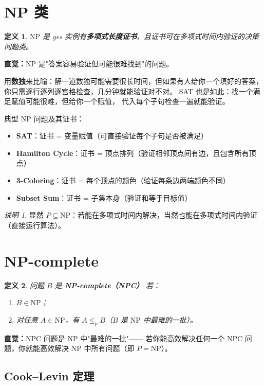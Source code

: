 \documentclass[UTF8,openany,12pt]{ctexbook}
\newtheorem{definition}{定义}[chapter]
\theoremstyle{remark}
\newtheorem{remark}{说明}[chapter]
\newcommand{\NP}{\mathrm{NP}}
\begin{document}
\section{NP 类}

\begin{definition}
$\NP$ 是 yes 实例有\textbf{多项式长度证书}，且证书可在多项式时间内验证的决策问题类。
\end{definition}

\textbf{直觉：}NP 是"答案容易验证但可能很难找到"的问题。

用\textbf{数独}来比喻：解一道数独可能需要很长时间，但如果有人给你一个填好的答案，
你只需逐行逐列逐宫格检查，几分钟就能验证对不对。
SAT 也是如此：找一个满足赋值可能很难，但给你一个赋值，
代入每个子句检查一遍就能验证。

典型 $\NP$ 问题及其证书：
\begin{itemize}
  \item \textbf{SAT}：证书 = 变量赋值（可直接验证每个子句是否被满足）
  \item \textbf{Hamilton Cycle}：证书 = 顶点排列（验证相邻顶点间有边，且包含所有顶点）
  \item \textbf{3-Coloring}：证书 = 每个顶点的颜色（验证每条边两端颜色不同）
  \item \textbf{Subset Sum}：证书 = 子集本身（验证和等于目标值）
\end{itemize}

\begin{remark}
显然 $P \subseteq \NP$：若能在多项式时间内解决，当然也能在多项式时间内验证（直接运行算法）。
\end{remark}

\section{NP-complete}

\begin{definition}
问题 $B$ 是 \textbf{NP-complete（NPC）} 若：
\begin{enumerate}
  \item $B \in \NP$；
  \item 对任意 $A \in \NP$，有 $A \le_p B$（$B$ 是 $\NP$ 中最难的一批）。
\end{enumerate}
\end{definition}

\textbf{直觉：}NPC 问题是 $\NP$ 中"最难的一批"——
若你能高效解决任何一个 NPC 问题，你就能高效解决 $\NP$ 中所有问题（即 $P = \NP$）。

\subsection{Cook--Levin 定理}
\end{document}
